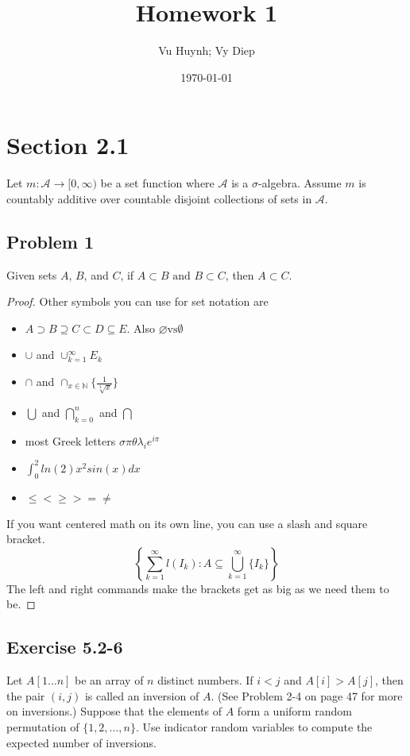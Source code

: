 \documentclass{article}
\title{Homework 1}
\author{Vu Huynh; Vy Diep}
\date\today
\begin{document}
\maketitle %

\section*{Section 2.1}
Let $m:\mathcal{A}\rightarrow [0,\infty)$ be a set function where $\mathcal{A}$ is a $\sigma$-algebra. Assume $m$ is countably additive over countable disjoint collections of sets in $\mathcal{A}$.

\subsection*{Problem 1}
Given sets $A$, $B$, and $C$, if $A\subset B \textrm{ and } B \subset C$, then $A \subset C$.
\begin{proof}
Other symbols you can use for set notation are
\begin{itemize}
\item$A \supset B \supseteq C \subset D \subseteq E$. Also $\varnothing \textrm{vs} \emptyset$
\item$\cup$ and $\cup_{k=1}^\infty E_k$
\item$\cap$ and $\cap_{x \in \mathbb{N}} \{\frac{1}{\sqrt[3]{x}}\}$
\item$\bigcup$ and $\bigcap\limits_{k=0}^n$ and $\bigcap$
\item most Greek letters $\sigma \pi \theta \lambda_i e^{i\pi}$
\item $\int_0^2 ln(2)x^2sin(x) dx$
\item$\leq < \geq > = \neq$
\end{itemize}
If you want centered math on its own line, you can use a slash and square bracket.\\
\[
\left \{
\sum\limits_{k=1}^\infty l(I_k):A\subseteq \bigcup_{k=1}^\infty \{I_k\}
\right \}
\]
The left and right commands make the brackets get as big as we need them to be.
\end{proof}

\clearpage %
\subsection*{Exercise 5.2-6}
Let $A[1 \ldots n]$ be an array of $n$ distinct numbers. If $i < j$ and $A[i] > A[j]$, 
then the pair $(i, j)$ is called an inversion of $A$. 
(See Problem 2-4 on page 47 for more on inversions.) 
Suppose that the elements of $A$ form a uniform random permutation of $\{1, 2, \ldots, n\}$. 
Use indicator random variables to compute the expected number of inversions.
\end{document}
